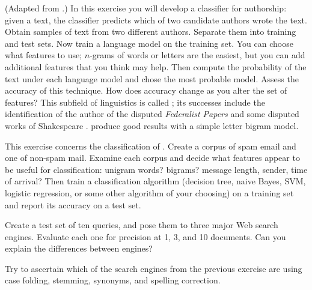 
\begin{exercise}\prgex
(Adapted from .)  In this exercise you
will develop a classifier for authorship: given a text, the classifier
predicts which of two candidate authors wrote the text.  Obtain
samples of text from two different authors.  Separate them into
training and test sets. Now train a language model on the training
set. You can choose what features to use; \(n\)-grams of words or
letters are the easiest, but you can add additional features that you
think may help. Then compute the probability of the text under each
language model and chose the most probable model. Assess the accuracy
of this technique. How does accuracy change as you alter the set of
features? This subfield of linguistics is called
; its successes include the identification of the
author of the disputed {\em Federalist Papers} \cite{Mosteller+Wallace:1964}
and some disputed works of Shakespeare
\cite{Hope:1994}.  produce good results
with a simple letter bigram model.
\end{exercise} 

\begin{exercise}\prgex
This exercise concerns the classification of .
Create a corpus of spam email and one of non-spam mail.  Examine each
corpus and decide what features appear to be useful for
classification: unigram words? bigrams? message length, sender, time
of arrival?  Then train a classification algorithm (decision tree,
naive Bayes, SVM, logistic regression, or some other algorithm of your
choosing) on a training set and report its accuracy on a test set.
\end{exercise} 



\begin{exercise}
Create a test set of ten queries, and pose them to three major Web
search engines. Evaluate each one for precision at 1, 3, and 10
documents. Can you explain the
differences between engines?
\end{exercise} 

\begin{uexercise}
Try to ascertain which of the search engines from the previous
exercise are using case folding, stemming, synonyms, and spelling
correction.
\end{uexercise} 

